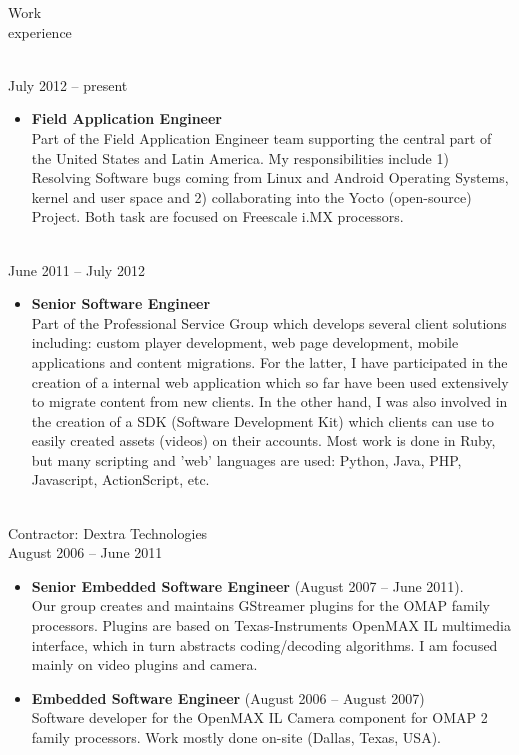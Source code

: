 \documentclass{resume}
\begin{document}
\begin{category}{Work \\experience}

\\
 July 2012 -- present
\begin{itemize}
\item \textbf{Field Application Engineer}\\
Part of the Field Application Engineer team supporting the central part of the United States and Latin America.
My responsibilities include 1) Resolving Software bugs coming from Linux and Android Operating Systems, kernel and
user space and 2) collaborating into the Yocto (open-source) Project. Both task are focused on Freescale i.MX processors. 
\end{itemize}

\\
 June 2011 -- July 2012
\begin{itemize}
\item \textbf{Senior Software Engineer}\\
Part of the Professional Service Group which develops several client solutions including: 
custom player development, web page development, mobile applications and content migrations.
For the latter, I have participated in the creation of a internal web application which so 
far have been used extensively to migrate content from new clients. In the other hand, 
I was also involved in the creation of a SDK (Software Development Kit) which clients 
can use to easily created assets (videos) on their accounts. Most work is done in Ruby, 
but many scripting and 'web' languages are used: Python, Java, PHP, Javascript, ActionScript, etc.
\end{itemize}

\\
Contractor: Dextra Technologies\\
August 2006 -- June 2011
\begin{itemize}
\item \textbf{Senior Embedded Software Engineer} (August 2007 -- June 2011).\\
Our group creates and maintains GStreamer plugins for the OMAP family processors. Plugins are based on Texas-Instruments OpenMAX IL multimedia interface,
which in turn abstracts coding/decoding algorithms. I am focused mainly on video plugins and camera.\\
\item \textbf{Embedded Software Engineer} (August 2006 -- August 2007)\\
Software developer for the OpenMAX IL Camera component for OMAP 2 family processors. Work mostly done on-site (Dallas, Texas, USA).\\
\end{itemize}


\end{category}
\end{document}
